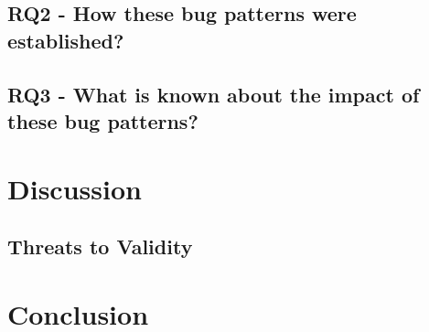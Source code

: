 \documentclass[conference]{IEEEtran}
\begin{document}
\subsection{RQ2 - How these bug patterns were established?} %
\label{sub:item_rq2}

\subsection{RQ3 - What is known about the impact of these bug patterns?} %
\label{sub:item_rq3}

\section{Discussion}
\subsection{Threats to Validity}
\section{Conclusion}




%
%

\end{document}
